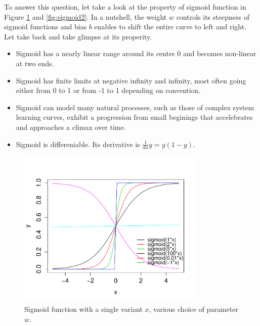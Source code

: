 \documentclass[
10pt, %
a4paper, %
oneside, %
headinclude,footinclude, %
BCOR5mm, %
]{scrartcl}
\begin{document}
To answer this question, let take a look at the property of sigmoid function in Figure \ref{fig:sigmoid} and \ref{fig:sigmoid2}. In a nutshell, the weight $w$ controls its steepness of sigmoid functions and bias $b$ enables to shift the entire curve to left and right. Let take back and take glimpse at its properity.

\begin{itemize}
\item Sigmoid has a nearly linear range around its centre 0 and becomes non-linear at two ends.
\item Sigmoid has finite limits at negative infinity and infinity, most often going either from 0 to 1 or from -1 to 1 depending on convention.
\item Sigmoid can model many natural processes, such as those of complex system learning curves, exhibit a progression from small beginings that accelebrates and approaches a climax over time.

\item Sigmoid is differeniable. Its derivative is $\frac{1}{dx} y = y (1-y)$.
\end{itemize}

  
\begin{figure}
\centering
\includegraphics[width=0.8\textwidth]{Figures/sigmoid.pdf}
\caption{Sigmoid function with a single variant $x$, various choice of parameter $w$.}
\label{fig:sigmoid}
\end{figure}
\end{document}
